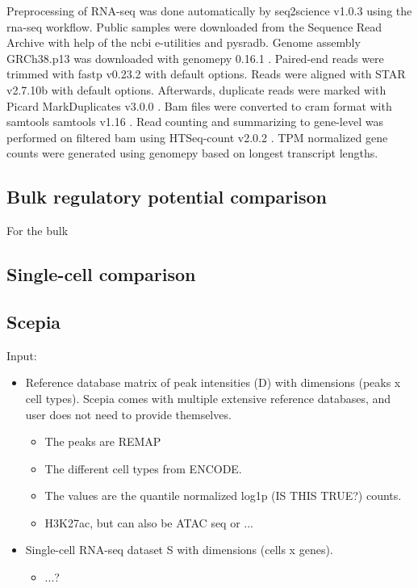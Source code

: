 Preprocessing of RNA-seq was done automatically by seq2science v1.0.3 \cite{seq2science} using the rna-seq workflow. Public samples were downloaded from the Sequence Read Archive \cite{Leinonen2010} with help of the ncbi e-utilities and pysradb\cite{Choudhary2019}. Genome assembly GRCh38.p13 was downloaded with genomepy 0.16.1 \cite{Frlich2023}. Paired-end reads were trimmed with fastp v0.23.2 \cite{Chen2018} with default options. Reads were aligned with STAR v2.7.10b \cite{Dobin2012} with default options. Afterwards, duplicate reads were marked with Picard MarkDuplicates v3.0.0 \cite{picard}. Bam files were converted to cram format with samtools samtools v1.16 \cite{Danecek2021}. Read counting and summarizing to gene-level was performed on filtered bam using HTSeq-count v2.0.2 \cite{Anders2014}. TPM normalized gene counts were generated using genomepy based on longest transcript lengths.

\subsection{Bulk regulatory potential comparison}

For the bulk 

\subsection{Single-cell comparison}


\subsection{Scepia}

\noindent
Input:

\begin{itemize}
	\item Reference database matrix of peak intensities (D) with dimensions (peaks x cell types). Scepia comes with multiple extensive reference databases, and user does not need to provide themselves.
    \begin{itemize}
    \item The peaks are REMAP
    \item The different cell types from ENCODE.
    \item The values are the quantile normalized log1p (IS THIS TRUE?) counts.
    \item H3K27ac, but can also be ATAC seq or ...
    \end{itemize}
	\item Single-cell RNA-seq dataset S with dimensions (cells x genes). 
    \begin{itemize}
        \item ...?
    \end{itemize}
\end{itemize}

